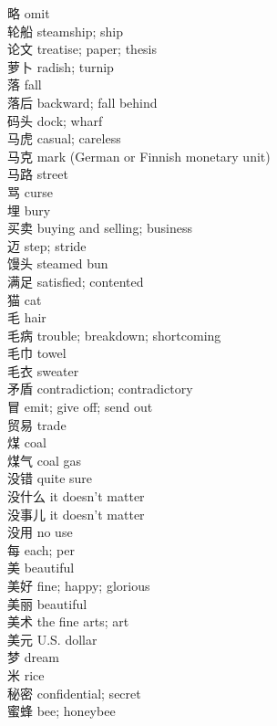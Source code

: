 略 \quad omit\\
轮船 \quad steamship; ship\\
论文 \quad treatise; paper; thesis\\
萝卜 \quad radish; turnip\\
落 \quad fall\\
落后 \quad backward; fall behind\\
码头 \quad dock; wharf\\
马虎 \quad casual; careless\\
马克 \quad mark (German or Finnish monetary unit)\\
马路 \quad street\\
骂 \quad curse\\
埋 \quad bury\\
买卖 \quad buying and selling; business\\
迈 \quad step; stride\\
馒头 \quad steamed bun\\
满足 \quad satisfied; contented\\
猫 \quad cat\\
毛 \quad hair\\
毛病 \quad trouble; breakdown; shortcoming\\
毛巾 \quad towel\\
毛衣 \quad sweater\\
矛盾 \quad contradiction; contradictory\\
冒 \quad emit; give off; send out\\
贸易 \quad trade\\
煤 \quad coal\\
煤气 \quad coal gas\\
没错 \quad quite sure\\
没什么 \quad it doesn't matter\\
没事儿 \quad it doesn't matter\\
没用 \quad no use\\
每 \quad each; per\\
美 \quad beautiful\\
美好 \quad fine; happy; glorious\\
美丽 \quad beautiful\\
美术 \quad the fine arts; art\\
美元 \quad U.S. dollar\\
梦 \quad dream\\
米 \quad rice\\
秘密 \quad confidential; secret\\
蜜蜂 \quad bee; honeybee\\
